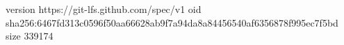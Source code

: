version https://git-lfs.github.com/spec/v1
oid sha256:6467fd313c0596f50aa66628ab9f7a94da8a84456540af6356878f995ec7f5bd
size 339174
